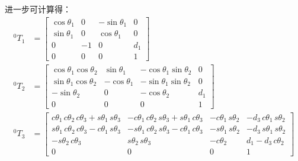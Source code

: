 \documentclass[UTF8, 13pt]{ctexart}
\begin{document}
进一步可计算得：
\[
\begin{aligned}
    {}^0 T_1 &= \begin{bmatrix}
                    \cos\theta_1 & 0 & -\sin\theta_1 & 0 \\
                    \sin\theta_1 & 0 & \cos\theta_1 & 0 \\
                    0 & -1 & 0 & d_1 \\
                    0 & 0 & 0 & 1
                \end{bmatrix} \\
    {}^0 T_2 &= \begin{bmatrix}
                    \cos\theta_1\cos\theta_2 & \sin\theta_1 & -\cos\theta_1\sin\theta_2 & 0 \\
                    \sin\theta_1\cos\theta_2 & -\cos\theta_1 & -\sin\theta_1\sin\theta_2 & 0 \\
                    -\sin\theta_2 & 0 & -\cos\theta_2 & d_1 \\
                    0 & 0 & 0 & 1
                \end{bmatrix} \\
    {}^0 T_3 &= \begin{bmatrix}
                    c\theta_1\, c\theta_2\, c\theta_3 + s\theta_1\, s\theta_3 & -c\theta_1\, c\theta_2\, s\theta_3 + s\theta_1\, c\theta_3 & -c\theta_1\, s\theta_2 & -d_3\, c\theta_1\, s\theta_2 \\
                    s\theta_1\, c\theta_2\, c\theta_3 - c\theta_1\, s\theta_3 & -s\theta_1\, c\theta_2\, s\theta_3 - c\theta_1\, c\theta_3 & -s\theta_1\, s\theta_2 & -d_3\, s\theta_1\, s\theta_2 \\
                    -s\theta_2\, c\theta_3 & s\theta_2\, s\theta_3 & -c\theta_2 & d_1 - d_3\, c\theta_2 \\
                    0 & 0 & 0 & 1
                \end{bmatrix}
\end{aligned}
\]
\end{document}
